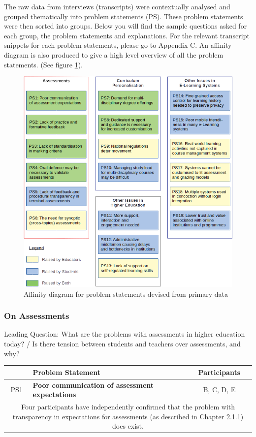The raw data from interviews (transcripts) were contextually analysed and grouped thematically into problem statements (PS).
These problem statements were then sorted into groups. Below you will find the sample questions asked for each group,
the problem statements and explanations.
For the relevant transcript snippets for each problem statements, please go to Appendix C.
An affinity diagram is also produced to give a high level overview of all the problem statements.
(See figure \ref{fig:ps-affinity}).
\begin{figure}[!ht]
	\centering
	\includegraphics[width=1.0\textwidth]{ps-affinity}
	\caption[Affinity diagram for primary data]
	{Affinity diagram for problem statements devised from primary data}
	\label{fig:ps-affinity}
\end{figure}

\subsubsection{On Assessments}

Leading Question: What are the problems with assessments in higher education today? /
Is there tension between students and teachers over assessments, and why?
\begin{table}[!ht]
	\begin{tabularx}{\textwidth}{|c|X|c|}
		\hline
		    & Problem Statement                                      & Participants \\
		\hline
		PS1 & \textbf{Poor communication of assessment expectations} & B, C, D, E   \\
		\hline
		\multicolumn{3}{|X|}{Four participants have independently confirmed that the problem with transparency in expectations for
			assessments (as described in Chapter 2.1.1) does exist.}                    \\
		\hline
	\end{tabularx}
\end{table}

